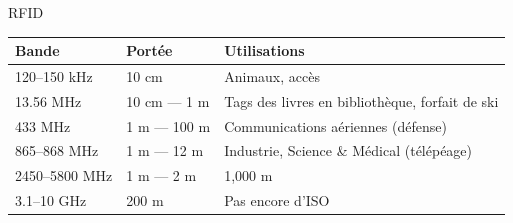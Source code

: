 \documentclass[aspectratio=169]{beamer}
\begin{document}
\begin{frame}{RFID}

\begin{table}[]
\begin{tabular}{|l|l|l|}
\hline
\textbf{Bande} & \textbf{Portée} & \textbf{Utilisations}                           \\ \hline
120–150 kHz    & 10 cm           & Animaux, accès                                  \\ \hline
13.56 MHz      & 10 cm — 1 m     & Tags des livres en bibliothèque, forfait de ski \\ \hline
433 MHz        & 1 m — 100 m     & Communications aériennes (défense)              \\ \hline
865–868 MHz    & 1 m — 12 m      & Industrie, Science \& Médical (télépéage)       \\ \hline
2450–5800 MHz  & 1 m — 2 m       & 1,000 m                                         \\ \hline
3.1–10 GHz     & 200 m           & Pas encore d’ISO                                \\ \hline
\end{tabular}
\end{table}

\end{frame}

\end{document}
